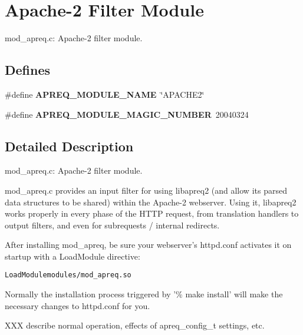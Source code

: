 \section{Apache-2 Filter Module}
\label{group__mod__apreq}
mod\_\-apreq.c: Apache-2 filter module. 
\subsection*{Defines}
\begin{CompactItemize}
\item 
{}
\#define {\bf APREQ\_\-MODULE\_\-NAME}\ \char`\"{}APACHE2\char`\"{}\label{group__mod__apreq_a19}

\item 
{}
\#define {\bf APREQ\_\-MODULE\_\-MAGIC\_\-NUMBER}\ 20040324\label{group__mod__apreq_a20}

\end{CompactItemize}


\subsection{Detailed Description}
mod\_\-apreq.c: Apache-2 filter module.

mod\_\-apreq.c provides an input filter for using libapreq2 (and allow its parsed data structures to be shared) within the Apache-2 webserver. Using it, libapreq2 works properly in every phase of the HTTP request, from translation handlers  to output filters, and even for subrequests / internal redirects.

After installing mod\_\-apreq, be sure your webserver's httpd.conf activates it on startup with a Load\-Module directive: \small\begin{alltt}{\tt 

     LoadModule modules/mod_apreq.so

 }\end{alltt}\normalsize 
 Normally the installation process triggered by '\% make install' will make the necessary changes to httpd.conf for you.

XXX describe normal operation, effects of apreq\_\-config\_\-t settings, etc. 